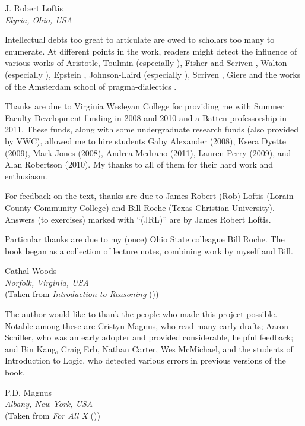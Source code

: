  \begin{adjustwidth}{2em}{0em} 
 J. Robert Loftis \\
\noindent \emph{Elyria, Ohio, USA} 
\end{adjustwidth}

\pagebreak
	
\thispagestyle{empty}

                                    
\noindent Intellectual debts too great to articulate are owed to scholars too many to enumerate. At different points in the work, readers might detect the influence of various works of Aristotle, Toulmin (especially \cite*{Toulmin1958}), Fisher and Scriven \parencite*{Fisher1997}, Walton (especially \cite*{Walton1996}), Epstein \parencite*{Epstein2002}, Johnson-Laird (especially \cite*{johnson2006we}), Scriven \parencite*{Scriven1962}, Giere \parencite*{giere1997understanding} and the works of the Amsterdam school of pragma-dialectics \citep{van2002argumentation}.

Thanks are due to Virginia Wesleyan College for providing me with Summer Faculty Development funding in 2008 and 2010 and a Batten professorship in 2011. These funds, along with some undergraduate research funds (also provided by VWC), allowed me to hire students Gaby Alexander (2008), Ksera Dyette (2009), Mark Jones (2008), Andrea Medrano (2011), Lauren Perry (2009), and Alan Robertson (2010). My thanks to all of them for their hard work and enthusiasm.

For feedback on the text, thanks are due to James Robert (Rob) Loftis (Lorain County Community College) and Bill Roche (Texas Christian University). Answers (to exercises) marked with “(JRL)” are by James Robert Loftis.

Particular thanks are due to my (once) Ohio State colleague Bill Roche. The book began as a collection of lecture notes, combining work by myself and Bill. 

\begin{adjustwidth}{2em}{0em}
Cathal Woods\\
\noindent\emph{Norfolk, Virginia, USA}\\
\noindent(Taken from \emph{Introduction to Reasoning} (\citeyear{Woods2014}))
\end{adjustwidth}


\vspace{3cm}

\noindent The author would like to thank the people who made this project possible. Notable among these are Cristyn Magnus, who read many early drafts; Aaron Schiller, who was an early adopter and provided considerable, helpful feedback; {and} Bin Kang, Craig Erb, Nathan Carter, Wes McMichael, and the students of Introduction to Logic, who detected various errors in previous versions of the book.


\begin{adjustwidth}{2em}{0em}
P.D. Magnus \\
\noindent\emph{Albany, New York, USA}\\
\noindent(Taken from \emph{For All X} (\citeyear{Magnus2008})) 
\end{adjustwidth}

